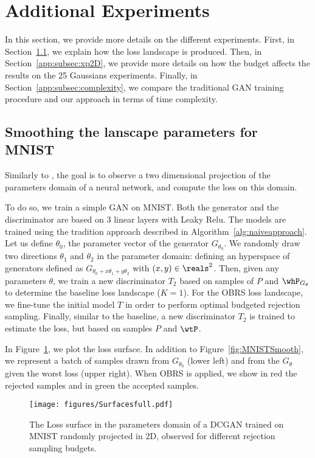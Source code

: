 \documentclass[twoside]{article}
\begin{document}
\section{Additional Experiments}
In this section, we provide more details on the different experiments. First, in Section~\ref{app:sec:MNIST}, we explain how the loss landscape is produced. Then, in Section~\ref{app:subsec:xp2D}, we provide more details on how the budget affects the results on the 25 Gaussians experiments. Finally, in Section~\ref{app:subsec:complexity}, we compare the traditional GAN training procedure and our approach in terms of time complexity. 









\subsection{Smoothing the lanscape parameters for MNIST}\label{app:sec:MNIST}
Similarly to \cite{li_visualizing_2018}, the goal is to observe a two dimensional projection of the parameters domain of a neural network, and compute the loss on this domain.

To do so, we train a simple GAN on MNIST. Both the generator and the discriminator are based on 3 linear layers with Leaky Relu. The models are trained using the tradition approach described in Algorithm~\ref{alg:naiveapproach}. Let us define $\theta_0$, the parameter vector of the generator $G_{\theta_0}$. We randomly draw two directions $\theta_1$ and $\theta_2$ in the parameter domain: defining an hyperspace of generators defined as $G_{\theta_0+x\theta_1+y\theta_2}$ with $(x, y)\in\reals^2$.  Then, given any parameters $\theta$, we train a new discriminator $T_2$ based on samples of $P$ and $\whP_{G_{\theta}}$ to determine the baseline loss landscape ($K=1$). For the OBRS loss landscape, we fine-tune the initial model $T$ in order to perform optimal budgeted rejection sampling. Finally, similar to the baseline, a new discriminator $T_2$ is trained to estimate the loss, but based on samples $P$ and $\wtP$. 

In Figure~\ref{app:fig:MNIST}, we plot the loss surface. In addition to Figure~\ref{fig:MNISTSmooth}, we represent a batch of samples drawn from $G_{\theta_0}$ (lower left) and from the $G_\theta$ given the worst loss (upper right). When OBRS is applied, we show in red the rejected samples and in green the accepted samples.  
\begin{figure}[H]
    \centering
    \texttt{[image: figures/Surfacesfull.pdf]}
    \caption{The Loss surface in the parameters domain of a DCGAN trained on MNIST randomly projected in 2D, observed for different rejection sampling budgets. }\label{app:fig:MNIST}
\end{figure}
\end{document}
